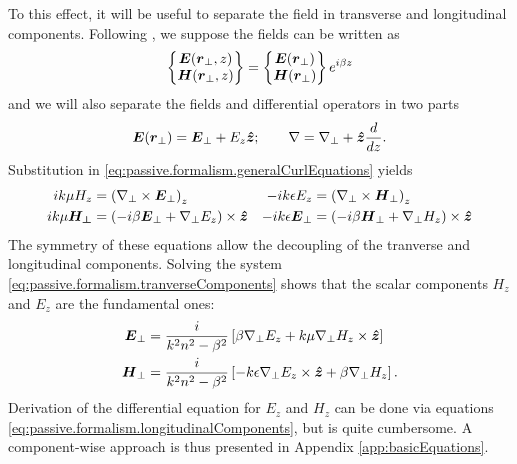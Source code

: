 To this effect, it will be useful to separate the field 
in transverse and longitudinal components. Following \cite{JAC1962,SCH2004b}, 
we suppose the fields can be written as 
  \begin{equation}
    \begin{Bmatrix}\boldsymbol{E}(\boldsymbol{r}_\perp,z)\\\boldsymbol{H}(\boldsymbol{r}_\perp,z)\end{Bmatrix} = \begin{Bmatrix}\boldsymbol{E}(\boldsymbol{r}_\perp)\\\boldsymbol{H}(\boldsymbol{r}_\perp)\end{Bmatrix}e^{i\beta z}
  \end{equation}
and we will also separate the fields and differential operators in two parts
  \begin{equation}
   \boldsymbol{E}(\boldsymbol{r}_\perp)= \boldsymbol{E}_\perp+E_z\boldsymbol{\hat{z}}; \qquad \nabla=\nabla_\perp + \boldsymbol{\hat{z}}\frac{d}{dz}.
  \end{equation}
Substitution in \eqref{eq:passive.formalism.generalCurlEquations} yields
  \begin{align}
    ik\mu H_z 		&= \left(\nabla_\perp\times\boldsymbol{E}_\perp\right)_z			& -ik\epsilon E_z 		&= \left(\nabla_\perp\times \boldsymbol{H}_\perp\right)_z	\label{eq:passive.formalism.longitudinalComponents}\\
    ik\mu\boldsymbol{H_\perp}	&= \left(-i\beta\boldsymbol{E}_\perp+\nabla_\perp E_z\right)\times\boldsymbol{\hat{z}}	& -ik\epsilon\boldsymbol{E}_\perp 	&= \left(-i\beta\boldsymbol{H}_\perp+\nabla_\perp H_z\right)\times\boldsymbol{\hat{z}} \label{eq:passive.formalism.tranverseComponents}
  \end{align}
The symmetry of these equations allow the decoupling of the tranverse and longitudinal components. 
Solving the system \eqref{eq:passive.formalism.tranverseComponents} 
shows that the scalar components $H_z$ and $E_z$ are the fundamental ones:
  \begin{subequations}
  \begin{align}
    \boldsymbol{E}_\perp	&= \frac{i}{k^2n^2-\beta^2}\left[\beta\nabla_\perp E_z+k\mu\nabla_\perp H_z\times\boldsymbol{\hat{z}}\right]	\\
    \boldsymbol{H}_\perp	&= \frac{i}{k^2n^2-\beta^2}\left[-k\epsilon\nabla_\perp E_z\times\boldsymbol{\hat{z}}+\beta\nabla_\perp H_z\right].
  \end{align}
  \end{subequations}
Derivation of the differential equation for $E_z$ and $H_z$ can be
done via equations \eqref{eq:passive.formalism.longitudinalComponents}, but
is quite cumbersome. A component-wise approach is thus presented in Appendix \ref{app:basicEquations}. 

